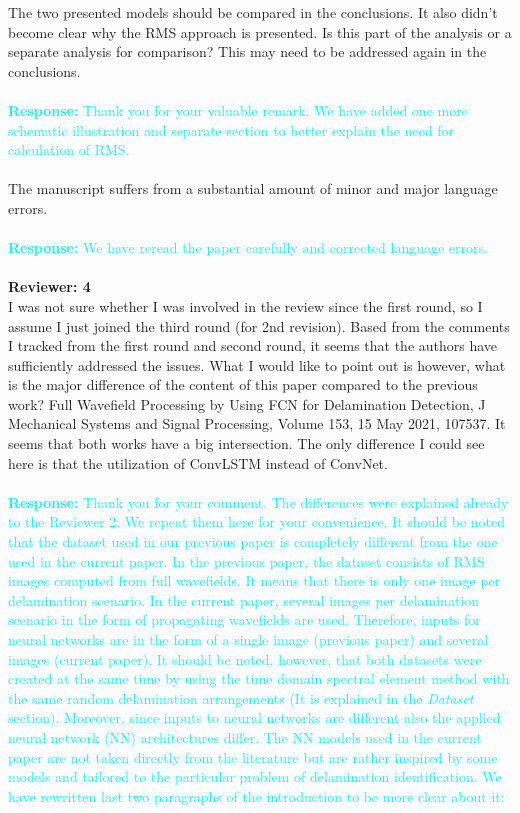 \documentclass[11pt,a2paper]{report}
\begin{document}
	The two presented models should be compared in the conclusions. 
	It also didn't become clear why the RMS approach is presented. 
	Is this part of the analysis or a separate analysis for comparison? 
	This may need to be addressed again in the conclusions.
		\\ \\
	\textcolor{Cyan}{
		\textbf{Response:}
	Thank you for your valuable remark.
	We have added one more schematic illustration and separate section to better explain the need for calculation of RMS.
    }
	\\ \\	
	The manuscript suffers from a substantial amount of minor and major language errors.
		\\ \\
	\textcolor{Cyan}{
		\textbf{Response:}
		We have reread the paper carefully and corrected language errors.
	}
	\\ \\
	\newpage
	\textbf{Reviewer: 4}  \\
	I was not sure whether I was involved in the review since the first round, so I assume I just joined the third round (for 2nd revision).
	Based from the comments I tracked from the first round and second round, it seems that the authors have sufficiently addressed the issues.
	What I would like to point out is however, what is the major difference of the content of this paper compared to the previous work?
	Full Wavefield Processing by Using FCN for Delamination Detection, J Mechanical Systems and Signal Processing, Volume 153, 15 May 2021, 107537.
	It seems that both works have a big intersection. The only difference I could see here is that the utilization of ConvLSTM instead of ConvNet.	
		\\ \\
	\textcolor{Cyan}{
		\textbf{Response:}
	Thank you for your comment. The differences were explained already to the Reviewer 2. We repeat them here for your convenience.
     It should be noted that the dataset used in our previous paper is completely different from the one used in the current paper. In the previous paper, the dataset consists of RMS images computed from full wavefields. It means that there is only one image per delamination scenario. In the current paper, several images per delamination scenario in the form of propagating wavefields are used. Therefore, inputs for neural networks are in the form of a single image (previous paper) and several images (current paper). It should be noted, however, that both datasets were created at the same time by using the time domain spectral element method with the same random delamination arrangements (It is explained in the \emph{Dataset} section).
    Moreover, since inputs to neural networks are different also the applied neural network (NN) architectures differ. The NN models used in the current paper are not taken directly from the literature but are rather inspired by some models and tailored to the particular problem of delamination identification.
    We have rewritten last two paragraphs of the introduction to be more clear about it:
}
\end{document}
